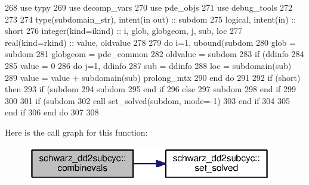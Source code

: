 \begin{DoxyCode}
268         \textcolor{keywordtype}{use }typy
269         \textcolor{keywordtype}{use }decomp_vars
270         \textcolor{keywordtype}{use }pde_objs
271         \textcolor{keywordtype}{use }debug_tools
272         
273         
274         \textcolor{keywordtype}{type}(subdomain_str), \textcolor{keywordtype}{intent(in out)} :: subdom
275         \textcolor{keywordtype}{logical}, \textcolor{keywordtype}{intent(in)} :: short
276         \textcolor{keywordtype}{integer(kind=ikind)} :: i, glob, globgeom, j, sub, loc
277         \textcolor{keywordtype}{real(kind=rkind)} :: \textcolor{keywordtype}{value}, oldvalue
278         
279         \textcolor{keywordflow}{do} i=1, ubound(subdom%
280           glob = subdom%
281           globgeom = pde_common%
282           oldvalue = subdom%
283           \textcolor{keywordflow}{if} (ddinfo%
284           
285             \textcolor{keywordtype}{value} = 0
286             \textcolor{keywordflow}{do} j=1, ddinfo%
287               sub = ddinfo%
288               loc = subdomain(sub)%
289               \textcolor{keywordtype}{value} = \textcolor{keywordtype}{value} + subdomain(sub)%
      prolong_mtx%
290 \textcolor{keywordflow}{            end do}
291 
292             \textcolor{keywordflow}{if} (short) \textcolor{keywordflow}{then}
293               \textcolor{keywordflow}{if} (subdom%
294                 subdom%
295 \textcolor{keywordflow}{              end if}
296             \textcolor{keywordflow}{else}
297               subdom%
298 \textcolor{keywordflow}{            end if}
299             
300             
301             \textcolor{keywordflow}{if} (subdom%
302               \textcolor{keyword}{call }set_solved(subdom, mode=-1)
303 \textcolor{keywordflow}{            end if}
304             
305 \textcolor{keywordflow}{          end if}
306 \textcolor{keywordflow}{        end do}
307         
308       
\end{DoxyCode}


Here is the call graph for this function\+:\nopagebreak
\begin{figure}[H]
\begin{center}
\leavevmode
\includegraphics[width=304pt]{namespaceschwarz__dd2subcyc_a8cf80997fb263fed0e4cc5ac533932b0_cgraph}
\end{center}
\end{figure}




